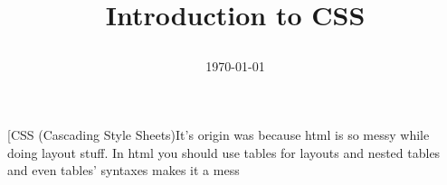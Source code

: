 \documentclass[a4paper]{article}
\title{
\vspace{-3em}
\begin{tcolorbox}
\Huge\sffamily Introduction to CSS
\end{tcolorbox}
\vspace{-3em}
}
\date{\today}
\makeatletter
\newcommand{\cornell}{\@ifnextchar[{\@with}{\@without}}
\newcommand{\@with}[4]{
\begin{tcolorbox}[enhanced,colback=gray,colframe=black,fonttitle=\large\bfseries\sffamily,sidebyside=true, nobeforeafter,colupper=blue,sidebyside align=top, lefthand width=.3\textwidth,
opacityframe=0,opacityback=.3,opacitybacktitle=1, opacitytext=1,
segmentation style={black!55,solid,opacity=0,line width=3pt},
title=#2
]
\tcblower
\sffamily
\begin{tcolorbox}[colback=blue!05,colframe=blue!10,width=\textwidth,nobeforeafter]
#3
\end{tcolorbox}
\end{tcolorbox}
}
\newcommand{\@without}[3]{
\begin{tcolorbox}[enhanced,colback=white!15,colframe=white,fonttitle=\bfseries,sidebyside=true, nobeforeafter,colupper=blue,sidebyside align=top, lefthand width=.3\textwidth,
opacityframe=0,opacityback=0,opacitybacktitle=0, opacitytext=1,
segmentation style={black!55,solid,opacity=0,line width=3pt}
]

\begin{tcolorbox}[colback=red!05,colframe=red!25,sidebyside align=top,
width=\textwidth,nobeforeafter]#1\end{tcolorbox}%
\tcblower
\sffamily
\begin{tcolorbox}[colback=blue!05,colframe=blue!10,width=\textwidth,nobeforeafter]
#2\\
#3
\end{tcolorbox}
\end{tcolorbox}
}
\makeatother
\begin{document}
\maketitle
\SetBgContents{\rule[0em]{4pt}{\textheight}}

\cornell{CSS (Cascading Style Sheets)}{It's origin was because html is so messy while doing layout stuff. In html you should use tables for layouts and nested tables and even tables' syntaxes makes it a mess}
\end{document}
